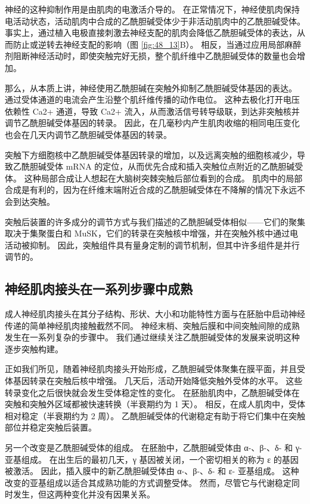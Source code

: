 神经的这种抑制作用是由肌肉的电激活介导的。 在正常情况下，神经使肌肉保持电活动状态，活动肌肉中合成的乙酰胆碱受体少于非活动肌肉中的乙酰胆碱受体。 事实上，通过植入电极直接刺激去神经支配的肌肉会降低乙酰胆碱受体的表达，从而防止或逆转去神经支配的影响（图 \ref{fig:48_13}B）。 相反，当通过应用局部麻醉剂阻断神经活动时，即使突触完好无损，整个肌纤维中乙酰胆碱受体的数量也会增加。

那么，从本质上讲，神经使用乙酰胆碱在突触外抑制乙酰胆碱受体基因的表达。 通过受体通道的电流会产生沿整个肌纤维传播的动作电位。 这种去极化打开电压依赖性 Ca2+ 通道，导致 Ca2+ 流入，从而激活信号转导级联，到达非突触核并调节乙酰胆碱受体基因的转录。 因此，在几毫秒内产生肌肉收缩的相同电压变化也会在几天内调节乙酰胆碱受体基因的转录。

突触下方细胞核中乙酰胆碱受体基因转录的增加，以及远离突触的细胞核减少，导致乙酰胆碱受体 mRNA 的定位，从而优先合成和插入突触位点附近的乙酰胆碱受体。 这种局部合成让人想起在大脑树突棘突触后部位看到的合成。 肌肉中的局部合成是有利的，因为在纤维末端附近合成的乙酰胆碱受体在不降解的情况下永远不会到达突触。

突触后装置的许多成分的调节方式与我们描述的乙酰胆碱受体相似——它们的聚集取决于集聚蛋白和 MuSK，它们的转录在突触核中增强，并在突触外核中通过电活动被抑制。 因此，突触组件具有量身定制的调节机制，但其中许多组件是并行调节的。

\subsection{神经肌肉接头在一系列步骤中成熟}
成人神经肌肉接头在其分子结构、形状、大小和功能特性方面与在胚胎中启动神经传递的简单神经肌肉接触截然不同。 神经末梢、突触后膜和中间突触间隙的成熟发生在一系列复杂的步骤中。 我们通过继续关注乙酰胆碱受体的发展来说明这种逐步突触构建。

正如我们所见，随着神经肌肉接头开始形成，乙酰胆碱受体聚集在膜平面，并且受体基因转录在突触后核中增强。 几天后，活动开始降低突触外受体的水平。 这些转录变化之后很快就会发生受体稳定性的变化。 在胚胎肌肉中，乙酰胆碱受体在突触和突触外区域都被快速转换（半衰期约为 1 天）。 相反，在成人肌肉中，受体相对稳定（半衰期约为 2 周）。 乙酰胆碱受体的代谢稳定有助于将它们集中在突触部位并稳定突触后装置。

另一个改变是乙酰胆碱受体的组成。 在胚胎中，乙酰胆碱受体由 α-、β-、δ- 和 γ- 亚基组成。 在出生后的最初几天，γ 基因被关闭，一个密切相关的称为 ε 的基因被激活。 因此，插入膜中的新乙酰胆碱受体由 α-、β-、δ- 和 ε- 亚基组成。 这种改变的亚基组成以适合其成熟功能的方式调整受体。 然而，尽管它与代谢稳定同时发生，但这两种变化并没有因果关系。


